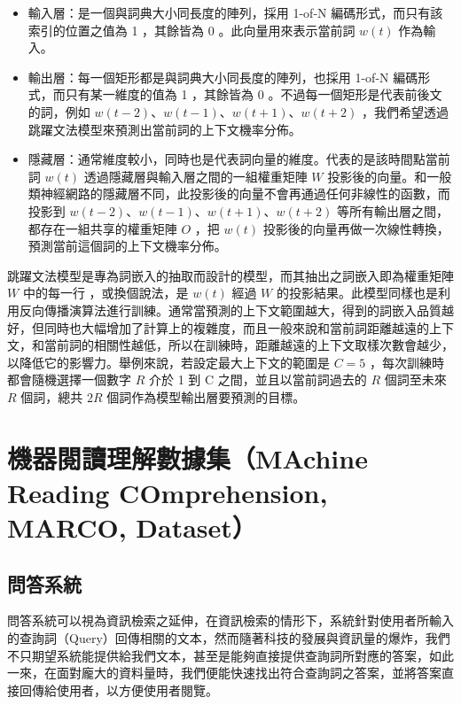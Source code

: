\begin{itemize}
    \item 輸入層：是一個與詞典大小同長度的陣列，採用 1-of-N 編碼形式，而只有該索引的位置之值為 1 ，其餘皆為 0 。此向量用來表示當前詞 $w(t)$ 作為輸入。
    \item 輸出層：每一個矩形都是與詞典大小同長度的陣列，也採用 1-of-N 編碼形式，而只有某一維度的值為 1 ，其餘皆為 0 。不過每一個矩形是代表前後文的詞，例如 $w(t-2)$、$w(t-1)$、$w(t+1)$、$w(t+2)$ ，我們希望透過跳躍文法模型來預測出當前詞的上下文機率分佈。
    \item 隱藏層：通常維度較小，同時也是代表詞向量的維度。代表的是該時間點當前詞 $w(t)$ 透過隱藏層與輸入層之間的一組權重矩陣 $W$ 投影後的向量。和一般類神經網路的隱藏層不同，此投影後的向量不會再通過任何非線性的函數，而投影到 $w(t-2)$、$w(t-1)$、$w(t+1)$、$w(t+2)$ 等所有輸出層之間，都存在一組共享的權重矩陣 $O$ ，把 $w(t)$ 投影後的向量再做一次線性轉換，預測當前這個詞的上下文機率分佈。
\end{itemize}

跳躍文法模型是專為詞嵌入的抽取而設計的模型，而其抽出之詞嵌入即為權重矩陣 $W$ 中的每一行%
，或換個說法，是 $w(t)$ 經過 $W$ 的投影結果。此模型同樣也是利用反向傳播演算法進行訓練。通常當預測的上下文範圍越大，得到的詞嵌入品質越好，但同時也大幅增加了計算上的複雜度，而且一般來說和當前詞距離越遠的上下文，和當前詞的相關性越低，所以在訓練時，距離越遠的上下文取樣次數會越少，以降低它的影響力。舉例來說，若設定最大上下文的範圍是 $C=5$ ，每次訓練時都會隨機選擇一個數字 $R$ 介於 1 到 C 之間，並且以當前詞過去的 $R$ 個詞至未來 $R$ 個詞，總共 $2R$ 個詞作為模型輸出層要預測的目標。

\section{機器閱讀理解數據集（MAchine Reading COmprehension, MARCO, Dataset）}
\subsection{問答系統}
問答系統可以視為資訊檢索之延伸，在資訊檢索的情形下，系統針對使用者所輸入的查詢詞（Query）回傳相關的文本，然而隨著科技的發展與資訊量的爆炸，我們不只期望系統能提供給我們文本，甚至是能夠直接提供查詢詞所對應的答案，如此一來，在面對龐大的資料量時，我們便能快速找出符合查詢詞之答案，並將答案直接回傳給使用者，以方便使用者閱覽。

